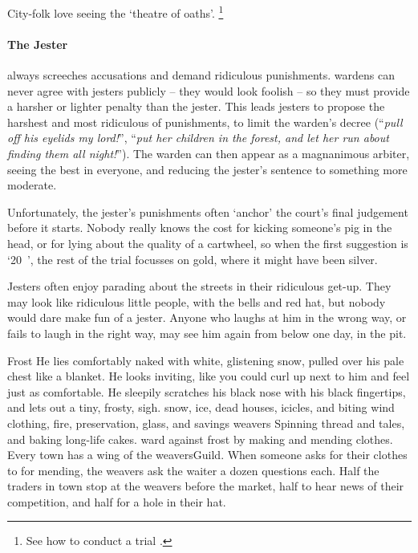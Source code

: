 \begin{multicols}{2}
City-folk love seeing the `theatre of oaths'.%
\footnote{See how to conduct a trial .}

\paragraph[the Jester]{The Jester}
\label{guildJester}%
always screeches accusations and demand ridiculous punishments.
\Glspl{warden} can never agree with jesters publicly -- they would look foolish -- so they must provide a harsher or lighter penalty than the jester.
This leads jesters to propose the harshest and most ridiculous of punishments, to limit the \gls{warden}'s decree (``\emph{pull off his eyelids my lord!}'', ``\emph{put her children in the forest, and let her run about finding them all night!}'').
The \gls{warden} can then appear as a magnanimous arbiter, seeing the best in everyone, and reducing the jester's sentence to something more moderate.

Unfortunately, the jester's punishments often `anchor' the court's final judgement before it starts.
Nobody really knows the cost for kicking someone's pig in the head, or for lying about the quality of a cartwheel, so when the first suggestion is `20~', the rest of the trial focusses on gold, where it might have been silver.

Jesters often enjoy parading about the streets in their ridiculous get-up.
They may look like ridiculous little people, with the bells and red hat, but nobody would dare make fun of a jester.
Anyone who laughs at him in the wrong way, or fails to laugh in the right way, may see him again from below one day, in the pit.

  {Frost}%
  {
    He lies comfortably naked with white, glistening snow, pulled over his pale chest like a blanket.
    He looks inviting, like you could curl up next to him and feel just as comfortable.
    He sleepily scratches his black nose with his black fingertips, and lets out a tiny, frosty, {\sffamily sigh}.
  }%
  {snow, ice, dead houses, icicles, and biting wind}%
  {clothing, fire, preservation, glass, and savings}%
  {\Glspl{weaver}}%
  {
    Spinning thread and tales, and baking long-life cakes.
  }%
ward against frost by making and mending clothes.
Every town has a wing of the \gls{weaversGuild}.
When someone asks for their clothes to for mending, the weavers ask the waiter a dozen questions each.
Half the traders in town stop at the weavers before the market, half to hear news of their competition, and half for a hole in their hat.


\end{multicols}

